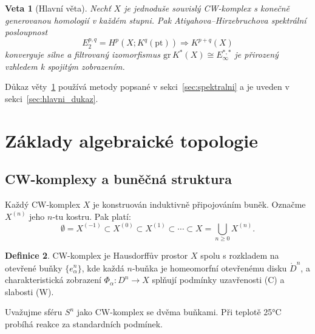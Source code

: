 \documentclass[12pt,a4paper]{article}
\theoremstyle{plain}
\newtheorem{theorem}{Veta}[section]
\theoremstyle{definition}
\newtheorem{definition}[theorem]{Definice}
\theoremstyle{remark}
\begin{document}
\begin{theorem}[Hlavn\'{i} v\v{e}ta]
\label{thm:hlavni}
Nech\v{t} $X$ je jednodu\v{s}e souvisl\'{y} CW-komplex s kone\v{c}n\v{e}
generovanou homologi\'{i} v ka\v{z}d\'{e}m stupni. Pak Atiyahova--Hirzebruchova
spektr\'{a}ln\'{i} posloupnost
\begin{equation}
\label{eq:ahss}
E_2^{p,q} = H^p(X; K^q(\mathrm{pt})) \Longrightarrow K^{p+q}(X)
\end{equation}
konverguje silne a filtrovan\'{y} izomorfismus
$\mathrm{gr}\, K^*(X) \cong E_\infty^{*,*}$
je p\v{r}irozen\'{y} vzhledem k spojit\'{y}m zobrazen\'{i}m.
\end{theorem}

D\r{u}kaz v\v{e}ty~\ref{thm:hlavni} pou\v{z}\'{i}v\'{a} metody popsan\'{e}
v sekci~\ref{sec:spektralni} a je uveden v sekci~\ref{sec:hlavni_dukaz}.

\section{Z\'{a}klady algebraick\'{e} topologie}
\label{sec:zaklady}

\subsection{CW-komplexy a bun\v{e}\v{c}n\'{a} struktura}

Ka\v{z}d\'{y} CW-komplex $X$ je konstruov\'{a}n induktivn\v{e} p\v{r}ipojov\'{a}n\'{i}m bun\v{e}k.
Ozna\v{c}me $X^{(n)}$ jeho $n$-tu kostru. Pak plat\'{i}:
\begin{equation}
\label{eq:cw_filtrace}
\emptyset = X^{(-1)} \subset X^{(0)} \subset X^{(1)} \subset \cdots \subset X = \bigcup_{n \geq 0} X^{(n)}.
\end{equation}

\begin{definition}
\label{def:cw}
CW-komplex je Hausdorff\r{u}v prostor $X$ spolu s rozkladem na otev\v{r}en\'{e}
bu\v{n}ky $\{e_\alpha^n\}$, kde ka\v{z}d\'{a} $n$-bu\v{n}ka je homeomorfn\'{i} otev\v{r}en\'{e}mu
disku $\mathring{D}^n$, a charakteristick\'{a} zobrazen\'{i} $\Phi_\alpha \colon D^n \to X$
spl\v{n}uj\'{i} podm\'{i}nky uzav\v{r}enosti (C) a slabosti (W).
\end{definition}

Uva\v{z}ujme sf\'{e}ru $S^n$ jako CW-komplex se dv\v{e}ma bu\v{n}kami.
P\v{r}i teplot\v{e} 25°C prob\'{i}h\'{a} reakce za standardn\'{i}ch podm\'{i}nek.
\end{document}
